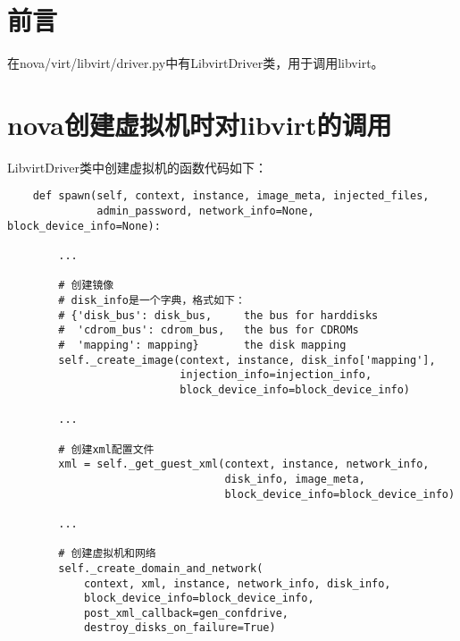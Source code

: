 \documentclass[a4paper,left=1.5cm,right=1.5cm,11pt]{article}
\begin{document}
\tableofcontents

\clearpage

\section{前言}
	在nova/virt/libvirt/driver.py中有LibvirtDriver类，用于调用libvirt。

\section{nova创建虚拟机时对libvirt的调用}
	LibvirtDriver类中创建虚拟机的函数代码如下：
	\begin{lstlisting}
	def spawn(self, context, instance, image_meta, injected_files,
              admin_password, network_info=None, block_device_info=None):

        ...

		# 创建镜像
		# disk_info是一个字典，格式如下：
		# {'disk_bus': disk_bus,     the bus for harddisks
        #  'cdrom_bus': cdrom_bus,   the bus for CDROMs
        #  'mapping': mapping}       the disk mapping
        self._create_image(context, instance, disk_info['mapping'],
                           injection_info=injection_info,
                           block_device_info=block_device_info)

        ...

		# 创建xml配置文件
        xml = self._get_guest_xml(context, instance, network_info,
                                  disk_info, image_meta,
                                  block_device_info=block_device_info)

		...

		# 创建虚拟机和网络
        self._create_domain_and_network(
            context, xml, instance, network_info, disk_info,
            block_device_info=block_device_info,
            post_xml_callback=gen_confdrive,
            destroy_disks_on_failure=True)
	\end{lstlisting}

\clearpage
\end{document}
